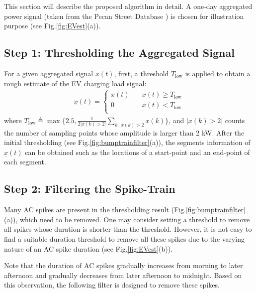 \documentclass[conference]{IEEEtran}
\begin{document}
This section will describe the proposed algorithm  in detail. A one-day aggregated power signal (taken from the Pecan Street Database \cite{PecanStreetDatabase}) is chosen for illustration purpose (see Fig.\ref{fig:EVest}(a)).



\subsection{Step 1: Thresholding the Aggregated Signal}

For a given aggregated signal $x(t)$, first, a threshold $T_{\mathrm{low}}$  is applied to obtain a rough estimate of the EV charging load signal:
\begin{eqnarray}
\underline{x}(t) = \left\{
\begin{array}{ll}
x(t) & \quad x(t)\geq T_{\mathrm{low}}\\
0 & \quad x(t) < T_{\mathrm{low}}\\
\end{array} \right.
\end{eqnarray}
where $T_{\mathrm{low}} \triangleq \max\big\{2.5,  \frac{1}{2|x(k)>2|}\sum_{k: \; x(k)>2} x(k)\big\}$,
and $|x(k)>2|$ counts the number of sampling points whose amplitude is larger than 2 kW. After the initial thresholding (see Fig.\ref{fig:bumptrainfilter}(a)), the segments information of $\underline{x}(t)$ can be obtained such as the locations of a start-point and an end-point of each segment.




\subsection{Step 2: Filtering the Spike-Train}

Many AC spikes are present in the thresholding result (Fig.\ref{fig:bumptrainfilter}(a)), which need to be removed. One may consider setting a threshold to remove all spikes whose duration is shorter than the threshold. However, it is not easy to find a suitable duration threshold to remove all these spikes due to the varying nature of an AC spike duration (see Fig.\ref{fig:EVest}(b)).

Note that the duration of AC spikes gradually increases from morning to later afternoon and gradually decreases from later afternoon to midnight. Based on this observation, the following filter is designed to remove these spikes.
\end{document}
